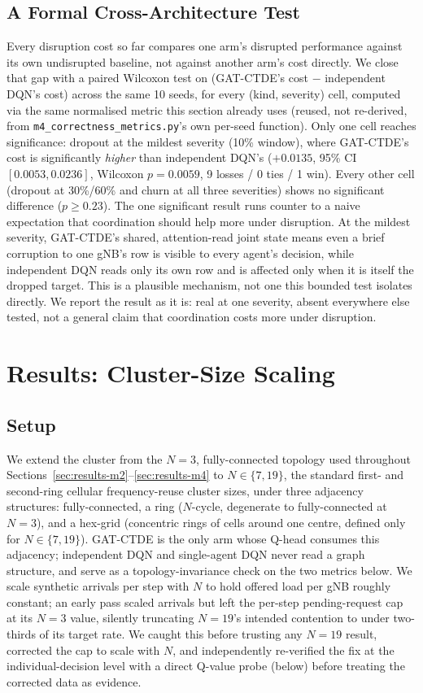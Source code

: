\documentclass[journal]{IEEEtran}
\begin{document}
\subsection{A Formal Cross-Architecture Test}
Every disruption cost so far compares one arm's disrupted performance
against its own undisrupted baseline, not against another arm's cost
directly. We close that gap with a paired Wilcoxon test on
(GAT-CTDE's cost $-$ independent DQN's cost) across the same 10 seeds,
for every (kind, severity) cell, computed via the same normalised
metric this section already uses (reused, not re-derived, from
\texttt{m4\_correctness\_metrics.py}'s own per-seed function). Only one cell
reaches significance: dropout at the mildest severity (10\% window),
where GAT-CTDE's cost is significantly \emph{higher} than independent
DQN's ($+0.0135$, 95\% CI $[0.0053, 0.0236]$, Wilcoxon $p=0.0059$, 9
losses / 0 ties / 1 win). Every other cell (dropout at 30\%/60\% and
churn at all three severities) shows no significant difference
($p \geq 0.23$). The one significant result runs counter to a naive
expectation that coordination should help more under disruption. At
the mildest severity, GAT-CTDE's shared, attention-read joint state
means even a brief corruption to one gNB's row is visible to every
agent's decision, while independent DQN reads only its own row and is
affected only when it is itself the dropped target. This is a plausible
mechanism, not one this bounded test isolates directly. We report the
result as it is: real at one severity, absent everywhere else tested,
not a general claim that coordination costs more under disruption.

\section{Results: Cluster-Size Scaling}
\label{sec:results-m6}

\subsection{Setup}
We extend the cluster from the $N=3$, fully-connected topology used
throughout Sections~\ref{sec:results-m2}--\ref{sec:results-m4} to
$N \in \{7, 19\}$, the standard first- and second-ring cellular
frequency-reuse cluster sizes, under three adjacency structures:
fully-connected, a ring ($N$-cycle, degenerate to fully-connected at
$N=3$), and a hex-grid (concentric rings of cells around one centre,
defined only for $N \in \{7, 19\}$). GAT-CTDE is the only arm whose
Q-head consumes this adjacency; independent DQN and single-agent DQN
never read a graph structure, and serve as a topology-invariance check
on the two metrics below. We scale synthetic arrivals per step with $N$
to hold offered load per gNB roughly constant; an early pass scaled
arrivals but left the per-step pending-request cap at its $N=3$ value,
silently truncating $N=19$'s intended contention to under two-thirds of
its target rate. We caught this before trusting any $N=19$ result,
corrected the cap to scale with $N$, and independently re-verified the
fix at the individual-decision level with a direct Q-value probe (below)
before treating the corrected data as evidence.
\end{document}
